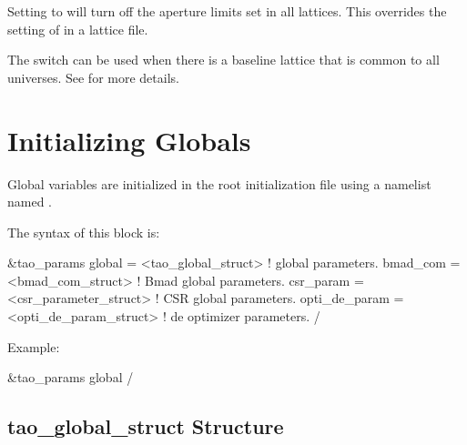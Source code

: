 {{{{{{{Setting  to  will turn off the
aperture limits set in all lattices. This overrides the setting of
 in a lattice file.

The  switch can be used when there is a baseline
lattice that is common to all universes. See  for more
details.

\section{Initializing Globals}
\label{s:globals} 

Global variables are initialized in the root initialization file using a 
namelist named .

The syntax of this block is:
\begin{example}
  &tao_params
    global        = <tao_global_struct>     ! global parameters. 
    bmad_com      = <bmad_com_struct>       ! Bmad global parameters. 
    csr_param     = <csr_parameter_struct>  ! CSR global parameters. 
    opti_de_param = <opti_de_param_struct>  ! de optimizer parameters. 
  /
\end{example}
Example:
\begin{example}
  &tao_params
    global%
  /
\end{example}

\subsection{tao\_global\_struct Structure}
\label{s:tao.global.struct} 

}}}}}}}
